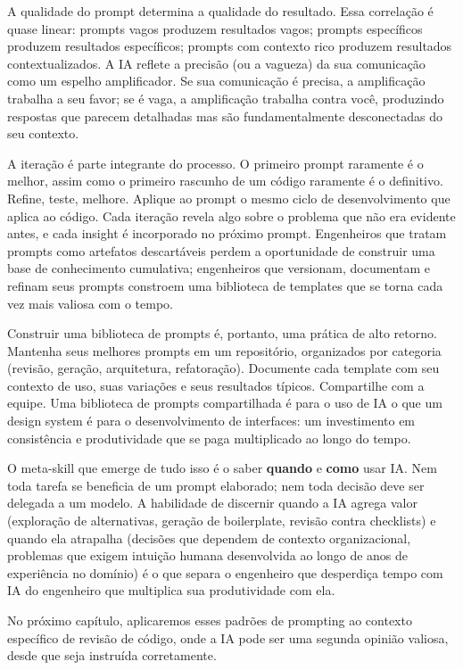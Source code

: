 A qualidade do prompt determina a qualidade do resultado. Essa correlação é
quase linear: prompts vagos produzem resultados vagos; prompts específicos
produzem resultados específicos; prompts com contexto rico produzem resultados
contextualizados. A IA reflete a precisão (ou a vagueza) da sua comunicação como
um espelho amplificador. Se sua comunicação é precisa, a amplificação trabalha a
seu favor; se é vaga, a amplificação trabalha contra você, produzindo respostas
que parecem detalhadas mas são fundamentalmente desconectadas do seu contexto.

A iteração é parte integrante do processo. O primeiro prompt raramente é o melhor,
assim como o primeiro rascunho de um código raramente é o definitivo. Refine,
teste, melhore. Aplique ao prompt o mesmo ciclo de desenvolvimento que aplica
ao código. Cada iteração revela algo sobre o problema que não era evidente antes,
e cada insight é incorporado no próximo prompt. Engenheiros que tratam prompts
como artefatos descartáveis perdem a oportunidade de construir uma base de
conhecimento cumulativa; engenheiros que versionam, documentam e refinam seus
prompts constroem uma biblioteca de templates que se torna cada vez mais valiosa
com o tempo.

Construir uma biblioteca de prompts é, portanto, uma prática de alto retorno.
Mantenha seus melhores prompts em um repositório, organizados por categoria
(revisão, geração, arquitetura, refatoração). Documente cada template com seu
contexto de uso, suas variações e seus resultados típicos. Compartilhe com a
equipe. Uma biblioteca de prompts compartilhada é para o uso de IA o que um
design system é para o desenvolvimento de interfaces: um investimento em
consistência e produtividade que se paga multiplicado ao longo do tempo.

O meta-skill que emerge de tudo isso é o saber \textbf{quando} e \textbf{como}
usar IA. Nem toda tarefa se beneficia de um prompt elaborado; nem toda decisão
deve ser delegada a um modelo. A habilidade de discernir quando a IA agrega valor
(exploração de alternativas, geração de boilerplate, revisão contra checklists) e
quando ela atrapalha (decisões que dependem de contexto organizacional, problemas
que exigem intuição humana desenvolvida ao longo de anos de experiência no
domínio) é o que separa o engenheiro que desperdiça tempo com IA do engenheiro que
multiplica sua produtividade com ela.

No próximo capítulo, aplicaremos esses padrões de prompting ao contexto
específico de revisão de código, onde a IA pode ser uma segunda opinião
valiosa, desde que seja instruída corretamente.

